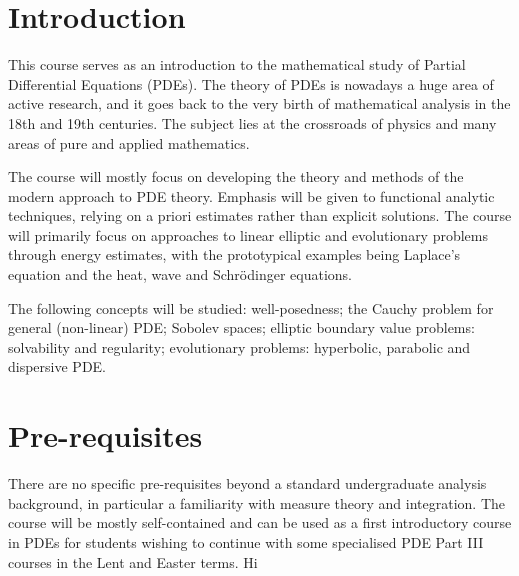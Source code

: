 \documentclass[a4paper,11pt]{article}
\begin{document}
	\maketitlepage
	\preliminaries
	\section*{Introduction}
	This course serves as an introduction to the mathematical study of Partial Differential Equations (PDEs). The theory of PDEs is nowadays a huge area of active research, and it goes back to the very birth of mathematical analysis in the 18th and 19th centuries. The subject lies at the crossroads of physics and many areas of pure and applied mathematics.

	\noindent The course will mostly focus on developing the theory and methods of the modern approach to PDE theory. Emphasis will be given to functional analytic techniques, relying on a priori estimates rather than explicit solutions. The course will primarily focus on approaches to linear elliptic and evolutionary problems through energy estimates, with the prototypical examples being Laplace’s equation and the heat, wave and Schr\"odinger equations.

	\noindent The following concepts will be studied: well-posedness; the Cauchy problem for general (non-linear) PDE; Sobolev spaces; elliptic boundary value problems: solvability and regularity; evolutionary problems: hyperbolic, parabolic and dispersive PDE.

	\section*{Pre-requisites}
	There are no specific pre-requisites beyond a standard undergraduate analysis background, in particular a familiarity with measure theory and integration. The course will be mostly self-contained and can be used as a first introductory course in PDEs for students wishing to continue with some specialised PDE Part III courses in the Lent and Easter terms.
	\newpage
	\tableofcontents
	\newpage
	\maintext
	Hi
	
\end{document}
